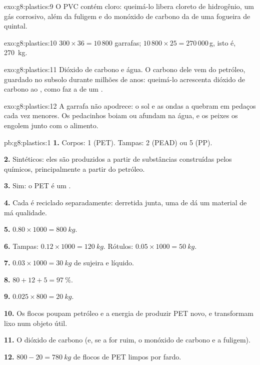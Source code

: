 \begin{solution}{exo:g8:plastics:9}
O PVC contém cloro: queimá-lo libera cloreto de hidrogênio, um gás
corrosivo, além da fuligem e do monóxido de carbono da  de uma fogueira de quintal.
\end{solution}

\begin{solution}{exo:g8:plastics:10}
$300 \times 36 = 10\,800$ garrafas; $10\,800 \times 25 = 270\,000$\,g,
isto é, \qty{270}{kg}.
\end{solution}

\begin{solution}{exo:g8:plastics:11}
Dióxido de carbono e água. O carbono dele vem do petróleo, guardado no
subsolo durante milhões de anos: queimá-lo acrescenta dióxido de carbono
ao , como faz a  de um .
\end{solution}

\begin{solution}{exo:g8:plastics:12}
A garrafa não apodrece: o sol e as ondas a quebram em pedaços cada vez
menores. Os pedacinhos boiam ou afundam na água, e os peixes os engolem
junto com o alimento.
\end{solution}

\begin{solution}{pb:g8:plastics:1}
\textbf{1.} Corpos: 1 (PET). Tampas: 2 (PEAD) ou 5 (PP).

\textbf{2.} Sintéticos: eles são produzidos a partir de substâncias
construídas pelos químicos, principalmente a partir do petróleo.

\textbf{3.} Sim: o PET é um .

\textbf{4.} Cada  é reciclado separadamente: derretida junta,
uma  de  dá um material de má qualidade.

\textbf{5.} $0.80 \times 1000 = \qty{800}{kg}$.

\textbf{6.} Tampas: $0.12 \times 1000 = \qty{120}{kg}$. Rótulos: $0.05
\times 1000 = \qty{50}{kg}$.

\textbf{7.} $0.03 \times 1000 = \qty{30}{kg}$ de sujeira e líquido.

\textbf{8.} $80 + 12 + 5 = \qty{97}{\percent}$.

\textbf{9.} $0.025 \times 800 = \qty{20}{kg}$.

\textbf{10.} Os flocos poupam petróleo e a energia de produzir PET novo,
e transformam lixo num objeto útil.

\textbf{11.} O dióxido de carbono (e, se a  for ruim, o monóxido
de carbono e a fuligem).

\textbf{12.} $800 - 20 = \qty{780}{kg}$ de flocos de PET limpos por fardo.
\end{solution}
